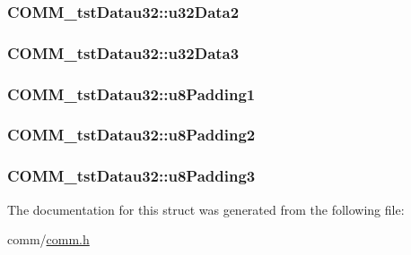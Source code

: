 \subsubsection[{u32\+Data2}]{ C\+O\+M\+M\+\_\+tst\+Datau32\+::u32\+Data2}\label{struct_c_o_m_m__tst_datau32_abf79270f34239131d76c1a4a3d0b5d18}
\hypertarget{struct_c_o_m_m__tst_datau32_af48b7a86c089616c67ec13b90f57f638}{}
\subsubsection[{u32\+Data3}]{ C\+O\+M\+M\+\_\+tst\+Datau32\+::u32\+Data3}\label{struct_c_o_m_m__tst_datau32_af48b7a86c089616c67ec13b90f57f638}
\hypertarget{struct_c_o_m_m__tst_datau32_ac4377a3f1946af211f6c670fd443ee91}{}
\subsubsection[{u8\+Padding1}]{ C\+O\+M\+M\+\_\+tst\+Datau32\+::u8\+Padding1}\label{struct_c_o_m_m__tst_datau32_ac4377a3f1946af211f6c670fd443ee91}
\hypertarget{struct_c_o_m_m__tst_datau32_aa3f93c745abb5d9fa4e837a0105be5d8}{}
\subsubsection[{u8\+Padding2}]{ C\+O\+M\+M\+\_\+tst\+Datau32\+::u8\+Padding2}\label{struct_c_o_m_m__tst_datau32_aa3f93c745abb5d9fa4e837a0105be5d8}
\hypertarget{struct_c_o_m_m__tst_datau32_a2ac8a5f484c5f558f923a0130ba2ed5f}{}
\subsubsection[{u8\+Padding3}]{ C\+O\+M\+M\+\_\+tst\+Datau32\+::u8\+Padding3}\label{struct_c_o_m_m__tst_datau32_a2ac8a5f484c5f558f923a0130ba2ed5f}


The documentation for this struct was generated from the following file\+:\begin{DoxyCompactItemize}
\item 
comm/\hyperlink{comm_8h}{comm.\+h}\end{DoxyCompactItemize}
